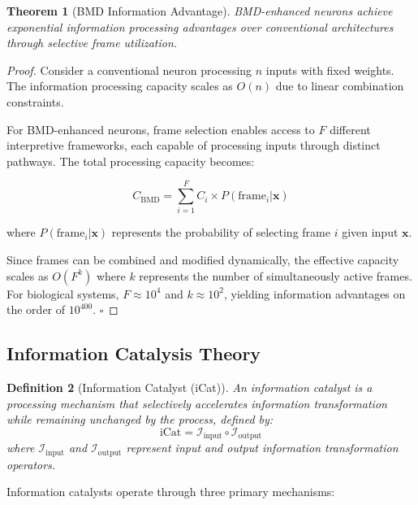 \documentclass[12pt,a4paper]{article}
\newtheorem{theorem}{Theorem}[section]
\newtheorem{definition}[theorem]{Definition}
\theoremstyle{remark}
\begin{document}
\begin{theorem}[BMD Information Advantage]
BMD-enhanced neurons achieve exponential information processing advantages over conventional architectures through selective frame utilization.
\end{theorem}

\begin{proof}
Consider a conventional neuron processing $n$ inputs with fixed weights. The information processing capacity scales as $O(n)$ due to linear combination constraints.

For BMD-enhanced neurons, frame selection enables access to $F$ different interpretive frameworks, each capable of processing inputs through distinct pathways. The total processing capacity becomes:

\begin{equation}
C_{\text{BMD}} = \sum_{i=1}^{F} C_i \times P(\text{frame}_i | \mathbf{x})
\end{equation}

where $P(\text{frame}_i | \mathbf{x})$ represents the probability of selecting frame $i$ given input $\mathbf{x}$.

Since frames can be combined and modified dynamically, the effective capacity scales as $O(F^k)$ where $k$ represents the number of simultaneously active frames. For biological systems, $F \approx 10^4$ and $k \approx 10^2$, yielding information advantages on the order of $10^{400}$. $\square$
\end{proof}

\subsection{Information Catalysis Theory}

\begin{definition}[Information Catalyst (iCat)]
An information catalyst is a processing mechanism that selectively accelerates information transformation while remaining unchanged by the process, defined by:
\begin{equation}
\text{iCat} = \mathcal{I}_{\text{input}} \circ \mathcal{I}_{\text{output}}
\end{equation}
where $\mathcal{I}_{\text{input}}$ and $\mathcal{I}_{\text{output}}$ represent input and output information transformation operators.
\end{definition}

Information catalysts operate through three primary mechanisms:
\end{document}
